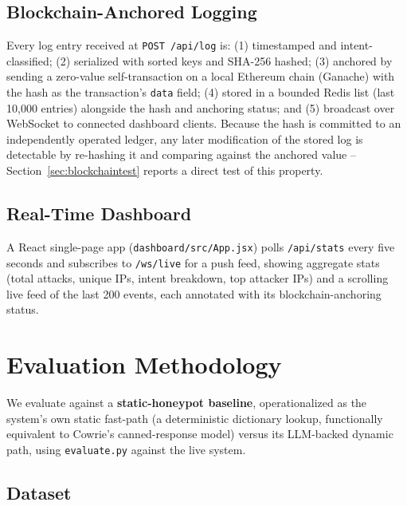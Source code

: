 \documentclass[conference]{IEEEtran}
\begin{document}
\subsection{Blockchain-Anchored Logging}

Every log entry received at \texttt{POST /api/log} is: (1) timestamped and
intent-classified; (2) serialized with sorted keys and SHA-256 hashed; (3)
anchored by sending a zero-value self-transaction on a local Ethereum chain
(Ganache) with the hash as the transaction's \texttt{data} field; (4) stored
in a bounded Redis list (last 10{,}000 entries) alongside the hash and
anchoring status; and (5) broadcast over WebSocket to connected dashboard
clients. Because the hash is committed to an independently operated ledger,
any later modification of the stored log is detectable by re-hashing it and
comparing against the anchored value -- Section~\ref{sec:blockchaintest}
reports a direct test of this property.

\subsection{Real-Time Dashboard}

A React single-page app (\texttt{dashboard/src/App.jsx}) polls
\texttt{/api/stats} every five seconds and subscribes to \texttt{/ws/live}
for a push feed, showing aggregate stats (total attacks, unique IPs, intent
breakdown, top attacker IPs) and a scrolling live feed of the last 200
events, each annotated with its blockchain-anchoring status.

\section{Evaluation Methodology}

We evaluate against a \textbf{static-honeypot baseline}, operationalized as
the system's own static fast-path (a deterministic dictionary lookup,
functionally equivalent to Cowrie's canned-response model) versus its
LLM-backed dynamic path, using \texttt{evaluate.py} against the live system.

\subsection{Dataset}
\end{document}

